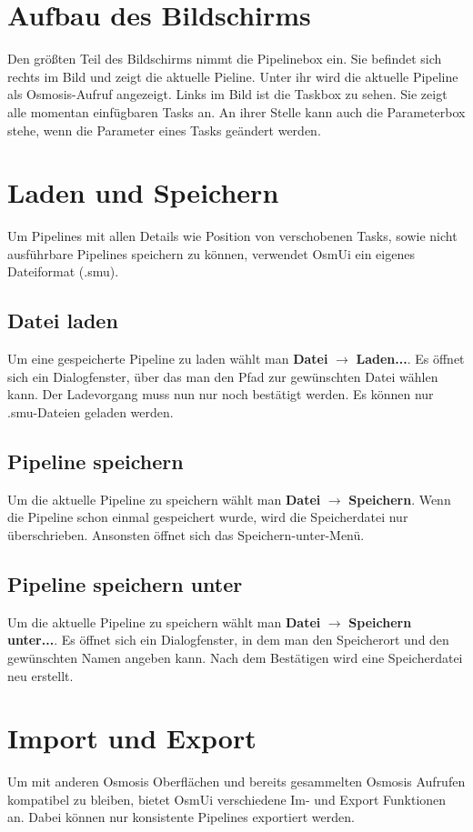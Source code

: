 \documentclass[a4paper,10pt]{scrartcl}
\begin{document}
\section{Aufbau des Bildschirms}
Den größten Teil des Bildschirms nimmt die Pipelinebox ein. Sie befindet sich rechts im Bild und zeigt die aktuelle Pieline. Unter ihr wird die aktuelle Pipeline als Osmosis-Aufruf angezeigt. Links im Bild ist die Taskbox zu sehen. Sie zeigt alle momentan einfügbaren Tasks an. An ihrer Stelle kann auch die Parameterbox stehe, wenn die Parameter eines Tasks geändert werden. 

\section{Laden und Speichern}
Um Pipelines mit allen Details wie Position von verschobenen Tasks, sowie nicht ausführbare Pipelines speichern zu können, verwendet OsmUi ein eigenes Dateiformat (.smu).
\subsection{Datei laden}
Um eine gespeicherte Pipeline zu laden wählt man \textbf{Datei} $\rightarrow$ \textbf{Laden...}. Es öffnet sich ein Dialogfenster, über das man den Pfad zur gewünschten Datei wählen kann. Der Ladevorgang muss nun nur noch bestätigt werden. Es können nur .smu-Dateien geladen werden.
\subsection{Pipeline speichern}
Um die aktuelle Pipeline zu speichern wählt man \textbf{Datei} $\rightarrow$ \textbf{Speichern}. Wenn die Pipeline schon einmal gespeichert wurde, wird die Speicherdatei nur überschrieben. Ansonsten öffnet sich das Speichern-unter-Menü. 
\subsection{Pipeline speichern unter}
Um die aktuelle Pipeline zu speichern wählt man \textbf{Datei} $\rightarrow$ \textbf{Speichern unter...}. Es öffnet sich ein Dialogfenster, in dem man den Speicherort und den gewünschten Namen angeben kann. Nach dem Bestätigen wird eine Speicherdatei neu erstellt. 

\section{Import und Export}
Um mit anderen Osmosis Oberflächen und bereits gesammelten Osmosis Aufrufen kompatibel zu bleiben, bietet OsmUi verschiedene Im- und Export Funktionen an. Dabei können nur konsistente Pipelines exportiert werden.
\end{document}
